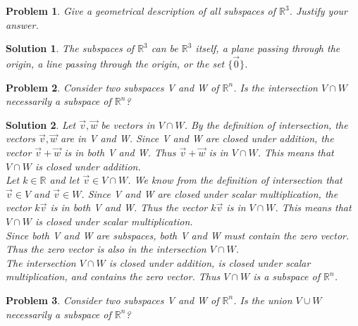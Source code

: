 \documentclass{article}
\newtheorem{problem}{Problem}
\newtheorem*{solution}{Solution}
\begin{document}
\begin{problem}
Give a geometrical description of all subspaces of $\mathbb{R}^3$. Justify your answer.
\end{problem}

\begin{solution}
The subspaces of $\mathbb{R}^3$ can be $\mathbb{R}^3$ itself, a plane passing through the origin, a line passing through the origin, or the set $\{ \vec{0} \}$.
\end{solution}

\begin{problem}
Consider two subspaces V and W of $\mathbb{R}^n$. Is the intersection $V \cap W$ necessarily a subspace of $\mathbb{R}^n$?
\end{problem}

\begin{solution}
Let $\vec{v}, \vec{w}$ be vectors in $V \cap W$. By the definition of intersection, the vectors $\vec{v}, \vec{w}$ are in V and W. Since V and W are closed under addition, the vector $\vec{v} + \vec{w}$ is in both V and W. Thus $\vec{v} + \vec{w}$ is in $V \cap W$. This means that $V \cap W$ is closed under addition. \\

Let $k \in \mathbb{R}$ and let $\vec{v} \in V \cap W$. We know from the definition of intersection that $\vec{v} \in V$ and $\vec{v} \in W$. Since V and W are closed under scalar multiplication, the vector $k \vec{v}$ is in both V and W. Thus the vector $k \vec{v}$ is in $V \cap W$. This means that $V \cap W$ is closed under scalar multiplication. \\

Since both V and W are subspaces, both V and W must contain the zero vector. Thus the zero vector is also in the intersection $V \cap W$. \\ 

The intersection $V \cap W$ is closed under addition, is closed under scalar multiplication, and contains the zero vector. Thus $V \cap W$ is a subspace of $\mathbb{R}^n$. 
\end{solution}

\begin{problem}
Consider two subspaces V and W of $\mathbb{R}^n$. Is the union $V \cup W$ necessarily a subspace of $\mathbb{R}^n$?
\end{problem}
\end{document}
